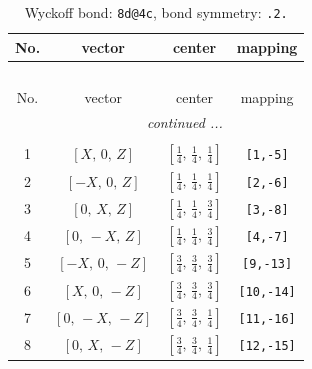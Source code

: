\documentclass[fleqn,8pt]{jsarticle}
\begin{document}
\renewcommand{\arraystretch}{1.2}
\begin{longtable}{cccc}
\caption{Wyckoff bond: {\tt 8d@4c}, bond symmetry: {\tt .2.}}
 \\
 \hline \hline
No. & vector & center & mapping \\ \hline \endfirsthead

\multicolumn{3}{l}{\tablename\ \thetable{}} \\
 \hline \hline
No. & vector & center & mapping \\ \hline \endhead

 \hline \hline
\multicolumn{3}{r}{\footnotesize\it continued ...} \\ \endfoot

 \hline \hline
\multicolumn{3}{r}{} \\ \endlastfoot

1 & $\left[ X,\, 0,\, Z \right]$ & $\left[ \frac{1}{4},\, \frac{1}{4},\, \frac{1}{4} \right]$ & {\tt [1,-5]} \\ \hline
2 & $\left[ - X,\, 0,\, Z \right]$ & $\left[ \frac{1}{4},\, \frac{1}{4},\, \frac{1}{4} \right]$ & {\tt [2,-6]} \\ \hline
3 & $\left[ 0,\, X,\, Z \right]$ & $\left[ \frac{1}{4},\, \frac{1}{4},\, \frac{3}{4} \right]$ & {\tt [3,-8]} \\ \hline
4 & $\left[ 0,\, - X,\, Z \right]$ & $\left[ \frac{1}{4},\, \frac{1}{4},\, \frac{3}{4} \right]$ & {\tt [4,-7]} \\ \hline
5 & $\left[ - X,\, 0,\, - Z \right]$ & $\left[ \frac{3}{4},\, \frac{3}{4},\, \frac{3}{4} \right]$ & {\tt [9,-13]} \\ \hline
6 & $\left[ X,\, 0,\, - Z \right]$ & $\left[ \frac{3}{4},\, \frac{3}{4},\, \frac{3}{4} \right]$ & {\tt [10,-14]} \\ \hline
7 & $\left[ 0,\, - X,\, - Z \right]$ & $\left[ \frac{3}{4},\, \frac{3}{4},\, \frac{1}{4} \right]$ & {\tt [11,-16]} \\ \hline
8 & $\left[ 0,\, X,\, - Z \right]$ & $\left[ \frac{3}{4},\, \frac{3}{4},\, \frac{1}{4} \right]$ & {\tt [12,-15]} \\
\end{longtable}
\renewcommand{\arraystretch}{1.2}
\end{document}
